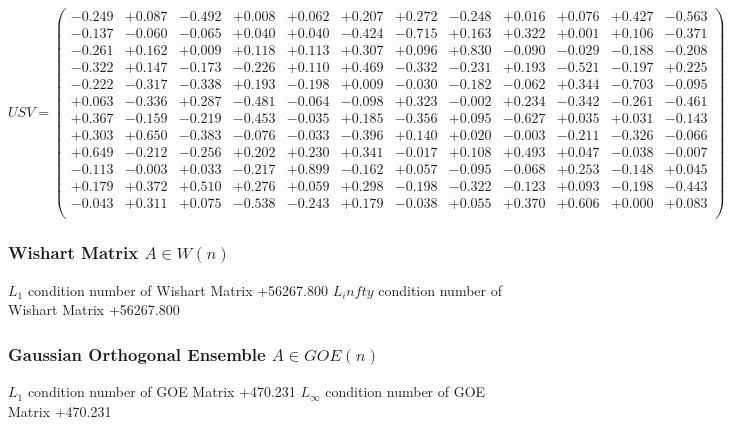 \documentclass[9pt]{article}
\theoremstyle{plain}
\theoremstyle{definition}
\theoremstyle{remark}
\numberwithin{equation}{section}
\begin{document}
$U S V = \left(
\begin{array}{
cccccccccccc}
-0.249 & +0.087 & -0.492 & +0.008 & +0.062 & +0.207 & +0.272 & -0.248 & +0.016 & +0.076 & +0.427 & -0.563 \\
-0.137 & -0.060 & -0.065 & +0.040 & +0.040 & -0.424 & -0.715 & +0.163 & +0.322 & +0.001 & +0.106 & -0.371 \\
-0.261 & +0.162 & +0.009 & +0.118 & +0.113 & +0.307 & +0.096 & +0.830 & -0.090 & -0.029 & -0.188 & -0.208 \\
-0.322 & +0.147 & -0.173 & -0.226 & +0.110 & +0.469 & -0.332 & -0.231 & +0.193 & -0.521 & -0.197 & +0.225 \\
-0.222 & -0.317 & -0.338 & +0.193 & -0.198 & +0.009 & -0.030 & -0.182 & -0.062 & +0.344 & -0.703 & -0.095 \\
+0.063 & -0.336 & +0.287 & -0.481 & -0.064 & -0.098 & +0.323 & -0.002 & +0.234 & -0.342 & -0.261 & -0.461 \\
+0.367 & -0.159 & -0.219 & -0.453 & -0.035 & +0.185 & -0.356 & +0.095 & -0.627 & +0.035 & +0.031 & -0.143 \\
+0.303 & +0.650 & -0.383 & -0.076 & -0.033 & -0.396 & +0.140 & +0.020 & -0.003 & -0.211 & -0.326 & -0.066 \\
+0.649 & -0.212 & -0.256 & +0.202 & +0.230 & +0.341 & -0.017 & +0.108 & +0.493 & +0.047 & -0.038 & -0.007 \\
-0.113 & -0.003 & +0.033 & -0.217 & +0.899 & -0.162 & +0.057 & -0.095 & -0.068 & +0.253 & -0.148 & +0.045 \\
+0.179 & +0.372 & +0.510 & +0.276 & +0.059 & +0.298 & -0.198 & -0.322 & -0.123 & +0.093 & -0.198 & -0.443 \\
-0.043 & +0.311 & +0.075 & -0.538 & -0.243 & +0.179 & -0.038 & +0.055 & +0.370 & +0.606 & +0.000 & +0.083 \\
\end{array}
\right)$ \newline 

\subsubsection{Wishart Matrix $A \in W(n)$}
$L_1$ condition number of Wishart Matrix +56267.800
$L_infty$ condition number of Wishart Matrix +56267.800
\subsubsection{Gaussian Orthogonal Ensemble $A \in GOE(n)$}
$L_1$ condition number of GOE Matrix +470.231
$L_\infty$ condition number of GOE Matrix +470.231
\end{document}
